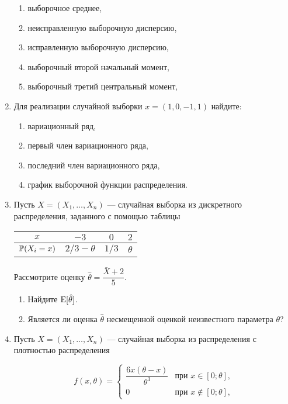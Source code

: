 \begin{enumerate}
\begin{enumerate}
\item выборочное среднее,
\item неисправленную выборочную дисперсию,
\item исправленную выборочную дисперсию,
\item выборочный второй начальный момент,
\item выборочный третий центральный момент,
\end{enumerate}

\item Для реализации случайной выборки $x=(1,0,-1,1)$ найдите:

\begin{enumerate}
\item вариационный ряд,
\item первый член вариационного ряда,
\item последний член вариационного ряда,
\item график выборочной функции распределения.
\end{enumerate}

\item Пусть $X=(X_1, \ldots,X_n)$ — случайная выборка из дискретного распределения, заданного с помощью таблицы

\begin{center}
\begin{tabular}{cccc}
\toprule
 $x$ & $-3$  &$ 0 $  & $2 $  \\
 \midrule
 $\P(X_i = x)$ & $2/3 - \theta$ & $1/3$ & $\theta$ \\
 \bottomrule
\end{tabular}
\end{center}

Рассмотрите оценку $\hat{\theta} = \dfrac{\bar{X}+2}{5}$.

\begin{enumerate}
    \item Найдите $\E[\hat{\theta}]$.
    \item Является ли оценка $\hat{\theta}$ несмещенной оценкой неизвестного параметра $\theta$?
\end{enumerate}

\item Пусть $X=(X_1, \ldots ,X_n)$ — случайная выборка из распределения с плотностью распределения

\[
f(x,\theta) = \begin{cases}
\dfrac{6x(\theta - x)}{\theta^3} & \text{при } x \in [0;\theta], \\
0 & \text{при } x \not\in [0;\theta],
\end{cases}
\]



\end{enumerate}
